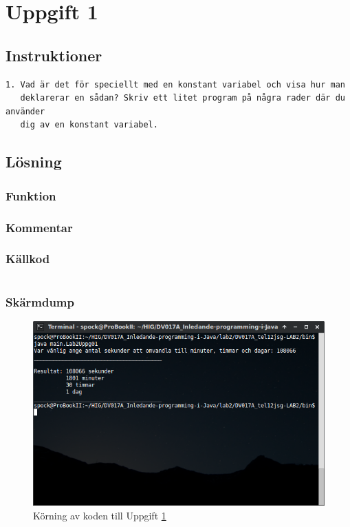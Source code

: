 \section{Uppgift 1}\label{sec:uppg01}

\subsection{Instruktioner}
\begin{verbatim}
1. Vad är det för speciellt med en konstant variabel och visa hur man
   deklarerar en sådan? Skriv ett litet program på några rader där du använder
   dig av en konstant variabel.
\end{verbatim}


\subsection{Lösning}
\subsubsection{Funktion}

\subsubsection{Kommentar}

\cite{jle:static}



\subsubsection{Källkod}
\inputminted[linenos]{java}{src/main/Lab2Uppg01.java}
\label{src:uppg01}


\subsubsection{Skärmdump}
\begin{figure}[htbp]
    \centering
        \includegraphics[width=\linewidth]{img/01.png}
    \caption{Körning av koden till Uppgift \ref{sec:uppg01}}
    \label{fig:uppg01-screenshot}
\end{figure}

